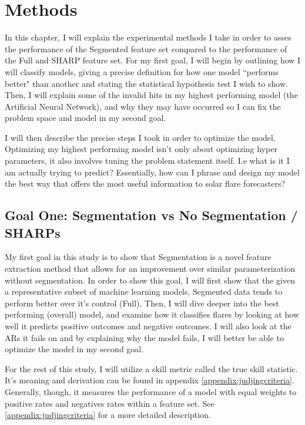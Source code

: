 \chapter{Methods}
\label{chaptermethods}
In this chapter, I will explain the experimental methods I take in order to asses the performance of the Segmented feature set compared to the performance of the Full and SHARP feature set. For my first goal, I will begin by outlining how I will classify models, giving a precise definition for how one model ``performs better" than another and stating the statistical hypothesis test I wish to show. Then, I will explain some of the invalid hits in my highest performing model (the Artificial Neural Network), and why they may have occurred so I can fix the problem space and model in my second goal.

I will then describe the precise steps I took in order to optimize the model. Optimizing my highest performing model isn't only about optimizing hyper parameters, it also involves tuning the problem statement itself. I.e what is it I am actually trying to predict? Essentially, how can I phrase and design my model the best way that offers the most useful information to solar flare forecasters?

\section{Goal One: Segmentation vs No Segmentation / SHARPs}
My first goal in this study is to show that Segmentation is a novel feature extraction method that allows for an improvement over similar parameterization without segmentation. In order to show this goal, I will first show that the given a representative subset of machine learning models, Segmented data tends to perform better over it's control (Full). Then, I will dive deeper into the best performing (overall) model, and examine how it classifies flares by looking at how well it predicts positive outcomes and negative outcomes. I will also look at the ARs it fails on and by explaining why the model fails, I will better be able to optimize the model in my second goal. 

For the rest of this study, I will utilize a skill metric called the true skill statistic. It's meaning and derivation can be found in appendix \ref{appendix:judjingcriteria}. Generally, though, it measures the performance of a model with equal weights to positive rates and negatives rates within a feature set. See \ref{appendix:judjingcriteria} for a more detailed description.  

